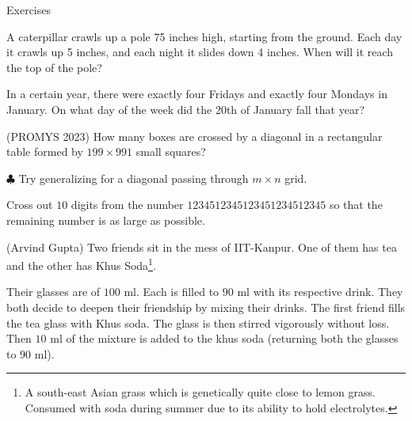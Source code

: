 \begin{xcb}{Exercises}
    \medskip
\begin{exc}

\item {} A caterpillar crawls up a pole 75 inches high, starting from the ground. 
Each day it crawls up 5 inches, and each night it slides down 4 inches. 
When will it reach the top of the pole? 
\begin{hint}
\end{hint}

\item {} In a certain year, there were exactly four Fridays and exactly four Mondays in January.
On what day of the week did the 20th of January fall that year? 
\begin{hint}
\end{hint}

\item {}(PROMYS 2023) How many boxes are crossed by a diagonal in a rectangular table 
formed by \(199 \times 991\) small squares? 

\(\clubsuit\)  Try generalizing for a 
diagonal passing through $m \times n$ grid.
\begin{hint}
\end{hint}

\item {} Cross out \(10\) digits from the number \(1234512345123451234512345\) so that the remaining 
number is as large as possible.
\begin{hint}
\end{hint}

\item {}(Arvind Gupta) Two friends sit in the mess of IIT-Kanpur. 
One of them has tea and the other has Khus Soda\footnote{A south-east Asian grass which is genetically quite close to lemon grass. 
Consumed with soda during summer due to its ability to hold electrolytes.}.

Their glasses are of \(100\) \si{\ml}. Each is filled to \(90\) \si{\ml} with its respective drink. 
They both decide to deepen their friendship by mixing their drinks. 
The first friend fills the tea glass with Khus soda. 
The glass is then stirred vigorously without loss. Then \(10\) \si{\ml} of the mixture is added to the khus soda
(returning both the glasses to \(90\) \si{\ml}). 


\end{exc}
\end{xcb}
